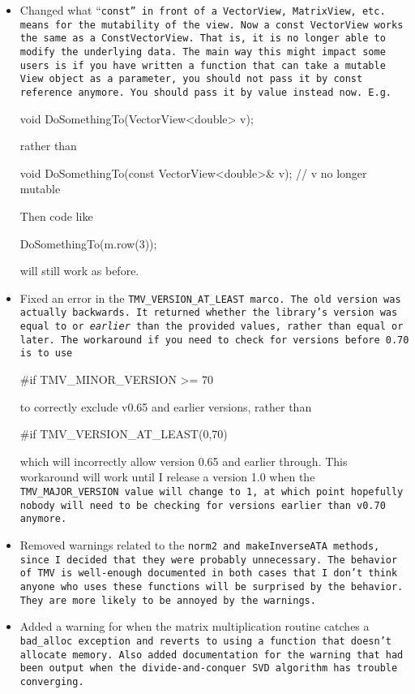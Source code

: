 \begin{itemize}
\item
Changed what ``\tt{const}'' in front of a \tt{VectorView},
\tt{MatrixView}, etc. means for the mutability of the view. 
Now a \tt{const VectorView} works the same as a 
\tt{ConstVectorView}.
That is, it is no longer able to modify the underlying data.
The main way this might impact some users is if you have written a function
that can take a mutable \tt{View} object as a parameter, you should not pass it
by \tt{const} reference anymore.  You should pass it by value instead now.  E.g.
\begin{tmvcode}
void DoSomethingTo(VectorView<double> v);
\end{tmvcode}
rather than
\begin{tmvcode}
void DoSomethingTo(const VectorView<double>& v); // v no longer mutable 
\end{tmvcode}
Then code like 
\begin{tmvcode}
DoSomethingTo(m.row(3));
\end{tmvcode}
will still work as before.

\item
Fixed an error in the \tt{TMV\_VERSION\_AT\_LEAST} marco.  The old version was actually backwards.  It returned whether the library's version was equal to or {\em earlier} than the provided values, rather than equal or later.  The workaround if you need to check for versions before 0.70 is to use 
\begin{tmvcode}
#if TMV_MINOR_VERSION >= 70 
\end{tmvcode}
to correctly exclude v0.65 and earlier versions, rather than
\begin{tmvcode}
#if TMV_VERSION_AT_LEAST(0,70)
\end{tmvcode}
which will incorrectly allow version 0.65 and earlier through.  This workaround will work until I release a version 1.0 when the \tt{TMV\_MAJOR\_VERSION} value will change to 1, at which point hopefully nobody will need to be checking for versions earlier than v0.70 anymore.

\item
Removed warnings related to the \tt{norm2} and \tt{makeInverseATA} methods, since I decided that they were probably unnecessary.  The behavior of TMV is well-enough documented in both cases that I don't think anyone who uses these functions will be surprised by the behavior.  They are more likely to be annoyed by the warnings.

\item 
Added a warning for when the matrix multiplication routine catches a \tt{bad\_alloc} exception and reverts to using a function that doesn't allocate memory.  Also added documentation for the warning that had been output when the divide-and-conquer SVD algorithm has trouble converging.


\end{itemize}
